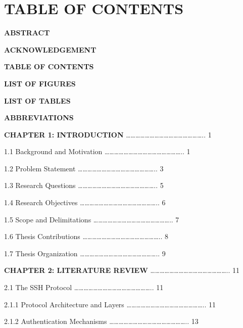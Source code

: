 \documentclass[
  a4paper]{report}
\begin{document}
\section{TABLE OF CONTENTS}\label{table-of-contents}

\textbf{ABSTRACT}

\textbf{ACKNOWLEDGEMENT}

\textbf{TABLE OF CONTENTS}

\textbf{LIST OF FIGURES}

\textbf{LIST OF TABLES}

\textbf{ABBREVIATIONS}

\textbf{CHAPTER 1: INTRODUCTION}
\ldots\ldots\ldots\ldots\ldots\ldots\ldots\ldots\ldots\ldots\ldots\ldots\ldots\ldots\ldots\ldots..
1

1.1 Background and Motivation
\ldots\ldots\ldots\ldots\ldots\ldots\ldots\ldots\ldots\ldots\ldots\ldots\ldots\ldots\ldots\ldots..
1

1.2 Problem Statement
\ldots\ldots\ldots\ldots\ldots\ldots\ldots\ldots\ldots\ldots\ldots\ldots\ldots\ldots\ldots\ldots..
3

1.3 Research Questions
\ldots\ldots\ldots\ldots\ldots\ldots\ldots\ldots\ldots\ldots\ldots\ldots\ldots\ldots\ldots\ldots..
5

1.4 Research Objectives
\ldots\ldots\ldots\ldots\ldots\ldots\ldots\ldots\ldots\ldots\ldots\ldots\ldots\ldots\ldots\ldots..
6

1.5 Scope and Delimitations
\ldots\ldots\ldots\ldots\ldots\ldots\ldots\ldots\ldots\ldots\ldots\ldots\ldots\ldots\ldots\ldots..
7

1.6 Thesis Contributions
\ldots\ldots\ldots\ldots\ldots\ldots\ldots\ldots\ldots\ldots\ldots\ldots\ldots\ldots\ldots\ldots..
8

1.7 Thesis Organization
\ldots\ldots\ldots\ldots\ldots\ldots\ldots\ldots\ldots\ldots\ldots\ldots\ldots\ldots\ldots\ldots..
9

\textbf{CHAPTER 2: LITERATURE REVIEW}
\ldots\ldots\ldots\ldots\ldots\ldots\ldots\ldots\ldots\ldots\ldots\ldots\ldots\ldots\ldots\ldots..
11

2.1 The SSH Protocol
\ldots\ldots\ldots\ldots\ldots\ldots\ldots\ldots\ldots\ldots\ldots\ldots\ldots\ldots\ldots\ldots..
11

2.1.1 Protocol Architecture and Layers
\ldots\ldots\ldots\ldots\ldots\ldots\ldots\ldots\ldots\ldots\ldots\ldots\ldots\ldots\ldots\ldots..
11

2.1.2 Authentication Mechanisms
\ldots\ldots\ldots\ldots\ldots\ldots\ldots\ldots\ldots\ldots\ldots\ldots\ldots\ldots\ldots\ldots..
13
\end{document}
